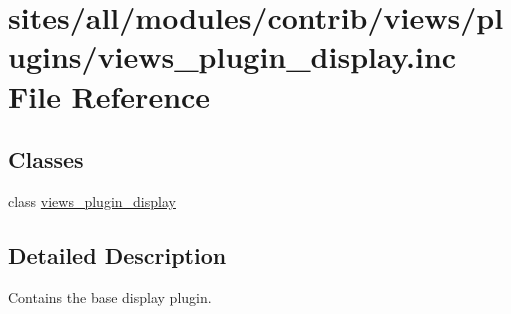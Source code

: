 \hypertarget{views__plugin__display_8inc}{
\section{sites/all/modules/contrib/views/plugins/views\_\-plugin\_\-display.inc File Reference}
\label{views__plugin__display_8inc}
}
\subsection*{Classes}
\begin{CompactItemize}
\item 
class \hyperlink{classviews__plugin__display}{views\_\-plugin\_\-display}
\end{CompactItemize}


\subsection{Detailed Description}
Contains the base display plugin. 